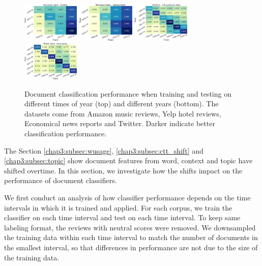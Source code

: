 \begin{figure}[tb!]
\includegraphics[width=0.244\textwidth]{images/chapter3/acl2018/year_hotel}
\includegraphics[width=0.244\textwidth]{images/chapter3/acl2018/year_rest}
\includegraphics[width=0.244\textwidth]{images/chapter3/acl2018/year_parties}
\includegraphics[width=0.244\textwidth]{images/chapter3/acl2018/year_economy}
\caption{\label{chap3:fig:time} Document classification performance when training and testing on different times of year (top) and different years (bottom). The datasets come from Amazon music reviews, Yelp hotel reviews, Economical news reports and Twitter. Darker indicate better classification performance.}
\end{figure}

The Section \ref{chap3:subsec:wusage}, \ref{chap3:subsec:ctt_shift} and \ref{chap3:subsec:topic} show document features from word, context and topic have shifted overtime. In this section, we investigate how the shifts impact on the performance of document classifiers.

We first conduct an analysis of how classifier performance depends on the time intervals in which it is trained and applied.
For each corpus, we train the classifier on each time interval and test on each time interval.
To keep same labeling format, the reviews with neutral scores were removed.
We downsampled the training data within each time interval to match the number of documents in the smallest interval, so that differences in performance are not due to the size of the training data.

